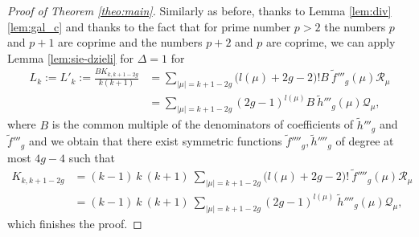 \documentclass[12pt]{amsart}
\theoremstyle{plain}
\theoremstyle{remark}
\begin{document}
\begin{proof}[Proof of Theorem \ref{theo:main}]
Similarly as before, thanks to Lemma \ref{lem:div}\ref{lem:gal_c} and thanks
to the fact that for prime number $p>2$ the numbers $p$ and $p+1$ are coprime and the
numbers $p+2$ and $p$ are coprime, we can apply Lemma \ref{lem:sie-dzieli} for
$\Delta=1$ for
\begin{align*}
L_k := L'_k := \frac{B K_{k,k+1-2g}}{k(k+1)} &=  \sum_{|\mu|=k+1-2g}
\big(l(\mu) + 2g - 2\big)! B\ \tilde{f}'''_g(\mu) \mathcal{R}_\mu \\ 
 &= \sum_{|\mu|=k+1-2g}
(2g - 1)^{l(\mu)}B\ \tilde{h}'''_g(\mu) \mathcal{Q}_\mu,
\end{align*} 
where $B$ is the common multiple of the denominators of coefficients of
$\tilde{h}'''_g$ and $\tilde{f}'''_g$ and we obtain that there exist symmetric
functions $\tilde{f}''''_g,
\tilde{h}''''_g$
of degree at most $4g-4$ such that
\begin{align*}
K_{k,k+1-2g} &= (k-1)\ k\ (k+1)\ \sum_{|\mu|=k+1-2g}
\big(l(\mu) + 2g - 2\big)! \ \tilde{f}''''_g(\mu) \mathcal{R}_\mu \\ 
 &= (k-1)\ k\ (k+1)\ \sum_{|\mu|=k+1-2g}
(2g - 1)^{l(\mu)}\ \tilde{h}''''_g(\mu) \mathcal{Q}_\mu,
\end{align*}
which finishes the proof.
\end{proof}
\end{document}
